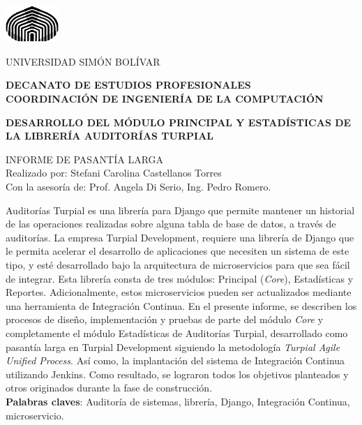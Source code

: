 \begin{center}
    \begin{singlespace}
        \includegraphics[width=2cm]{logo_USB}

        {\large
          UNIVERSIDAD SIMÓN BOLÍVAR\\
        }

        \textbf{
          DECANATO DE ESTUDIOS PROFESIONALES\\
          COORDINACIÓN DE INGENIERÍA DE LA COMPUTACIÓN
        }

        \vspace{0.5cm}
        \textbf{
          DESARROLLO DEL MÓDULO PRINCIPAL Y ESTADÍSTICAS DE LA LIBRERÍA AUDITORÍAS TURPIAL
        }

        \vspace{0.5cm}
        INFORME DE PASANTÍA LARGA\\
        Realizado por:
        Stefani Carolina Castellanos Torres\\

        Con la asesoría de: Prof. Angela Di Serio, Ing. Pedro Romero.\\
    \end{singlespace}
\end{center}

Auditorías Turpial es una librería para Django que permite mantener un historial de las operaciones realizadas sobre alguna tabla de base de datos, a través de auditorías. La empresa Turpial Development, requiere una librería de Django que le permita acelerar el desarrollo de aplicaciones que necesiten un sistema de este tipo, y esté desarrollado bajo la arquitectura de microservicios para que sea fácil de integrar. Esta librería consta de tres módulos: Principal (\textit{Core}), Estadísticas y Reportes. Adicionalmente, estos microservicios pueden ser actualizados mediante una herramienta de Integración Continua. En el presente informe, se describen los procesos de diseño, implementación y pruebas de parte del módulo \textit{Core} y completamente el módulo Estadísticas de Auditorías Turpial, desarrollado como pasantía larga en Turpial Development siguiendo la metodología \textit{Turpial Agile Unified Process}. Así como, la implantación del sistema de Integración Continua utilizando Jenkins. Como resultado, se lograron todos los objetivos planteados y otros originados durante la fase de construcción. \\

\textbf{Palabras claves}: Auditoría de sistemas, librería, Django, Integración Continua, microservicio.
